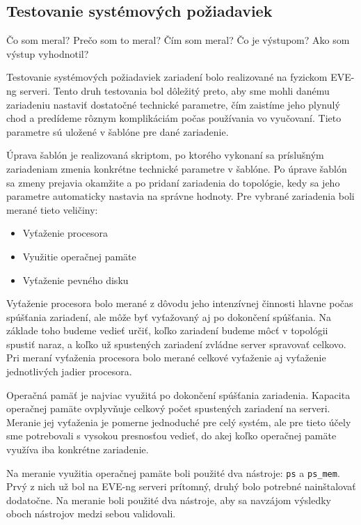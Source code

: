 \subsection{Testovanie systémových požiadaviek}
\label{chap:testovanie_zariadeni_benchmark}

Čo som meral?
Prečo som to meral?
Čím som meral?
Čo je výstupom?
Ako som výstup vyhodnotil?

Testovanie systémových požiadaviek zariadení bolo realizované na fyzickom EVE-ng serveri. Tento druh testovania bol dôležitý preto, aby sme mohli danému zariadeniu nastaviť dostatočné technické parametre, čím zaistíme jeho plynulý chod a predídeme rôznym komplikáciám počas používania vo vyučovaní. Tieto parametre sú uložené v šablóne pre dané zariadenie.

Úprava šablón je realizovaná skriptom, po ktorého vykonaní sa príslušným zariadeniam zmenia konkrétne technické parametre v šablóne. Po úprave šablón sa zmeny prejavia okamžite a po pridaní zariadenia do topológie, kedy sa jeho parametre automaticky nastavia na správne hodnoty. Pre vybrané zariadenia boli merané tieto veličiny:

\begin{itemize}
\item Vyťaženie procesora
\item Využitie operačnej pamäte
\item Vyťaženie pevného disku
\end{itemize}

Vyťaženie procesora bolo merané z dôvodu jeho intenzívnej činnosti hlavne počas spúšťania zariadení, ale môže byť vyťažovaný aj po dokončení spúšťania. Na základe toho budeme vedieť určiť, koľko zariadení budeme môcť v topológii spustiť naraz, a koľko už spustených zariadení zvládne server spravovať celkovo. Pri meraní vyťaženia procesora bolo merané celkové vyťaženie aj vyťaženie jednotlivých jadier procesora.

Operačná pamäť je najviac využitá po dokončení spúšťania zariadenia. Kapacita operačnej pamäte ovplyvňuje celkový počet spustených zariadení na serveri. Meranie jej vyťaženia je pomerne jednoduché pre celý systém, ale pre tieto účely sme potrebovali s vysokou presnosťou vedieť, do akej koľko operačnej pamäte využíva iba konkrétne zariadenie.

Na meranie využitia operačnej pamäte boli použité dva nástroje: \texttt{ps} a \texttt{ps\_mem}. Prvý z nich už bol na EVE-ng serveri prítomný, druhý bolo potrebné nainštalovať dodatočne. Na meranie boli použité dva nástroje, aby sa navzájom výsledky oboch nástrojov medzi sebou validovali.

